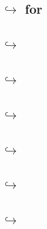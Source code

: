 \subsection{\hubMod{} $\hookrightarrow$ \blockHashMod{} for \cite{EIP-2935}                                 \lispDone{} } \label{hub: lookups: into block hash for EIP2935}           
\subsection{\hubMod{} $\hookrightarrow$ \trmMod{}                                                           \lispDone{} } \label{hub: lookups: into trm}                              
\subsection{\hubMod{} $\hookrightarrow$ \expMod{}                                                           \lispDone{} } \label{hub: lookups: into exp}                              
\subsection{\hubMod{} $\hookrightarrow$ \mmuMod{}                                                           \lispDone{} } \label{hub: lookups: into mmu}                              
\subsection{\hubMod{} $\hookrightarrow$ \mxpMod{}                                                           \lispDone{} } \label{hub: lookups: into mxp}                              
\subsection{\hubMod{} $\hookrightarrow$ \oobMod{}                                                           \lispDone{} } \label{hub: lookups: into oob}                              
\subsection{\hubMod{} $\hookrightarrow$ \stpMod{}                                                           \lispDone{} } \label{hub: lookups: into stp}                              
